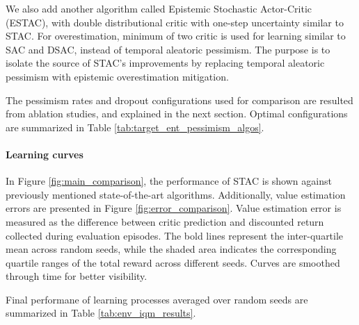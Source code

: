 \documentclass{article}
\begin{document}
We also add another algorithm called Epistemic Stochastic Actor-Critic (ESTAC), with double distributional critic with one-step uncertainty similar to STAC. For overestimation, minimum of two critic is used for learning similar to SAC and DSAC, instead of temporal aleatoric pessimism. The purpose is to isolate the source of STAC's improvements by replacing temporal aleatoric pessimism with epistemic overestimation mitigation.

The pessimism rates and dropout configurations used for comparison are resulted from ablation studies, and explained in the next section. Optimal configurations are summarized in Table \ref{tab:target_ent_pessimism_algos}. 

\paragraph{Learning curves} In Figure \ref{fig:main_comparison}, the performance of STAC is shown against previously mentioned state-of-the-art algorithms. Additionally, value estimation errors are presented in Figure \ref{fig:error_comparison}. Value estimation error is measured as the difference between critic prediction and discounted return collected during evaluation episodes. The bold lines represent the inter-quartile mean across random seeds, while the shaded area indicates the corresponding quartile ranges of the total reward across different seeds. Curves are smoothed through time for better visibility. 

Final performane of learning processes averaged over random seeds are summarized in Table \ref{tab:env_iqm_results}. 

\end{document}
